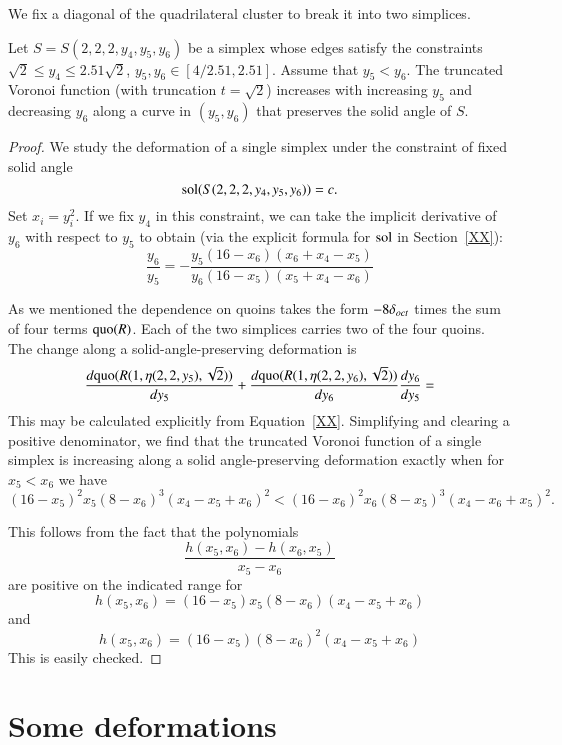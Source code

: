 We fix a diagonal of the quadrilateral cluster to break it into
two simplices.

\begin{lemma}  Let $S=S(2,2,2,y_4,y_5,y_6)$ be a simplex whose
edges satisfy the constraints $\sqrt2\le y_4\le 2.51\sqrt2$,
$y_5,y_6\in [4/2.51,2.51]$.  Assume that $y_5 < y_6$.  The
truncated Voronoi function (with truncation $t=\sqrt2$) increases
with increasing $y_5$ and decreasing $y_6$ along a curve in
$(y_5,y_6)$ that preserves the solid angle of $S$.
\end{lemma}



\begin{proof}
We study the deformation of a single simplex under the constraint
of fixed solid angle
    $$\operatorname{sol}(S(2,2,2,y_4,y_5,y_6)) = c.$$
Set $x_i = y_i^2$.  If we fix $y_4$ in this constraint, we can
take the implicit derivative of $y_6$ with respect to $y_5$ to
obtain (via the explicit formula for $\operatorname{sol}$ in Section~\ref{XX}):
    $$
    \frac{y_6}{y_5} = -\frac{y_5 (16- x_6)(x_6 + x_4 - x_5 )}
    {y_6 (16-x_5)(x_5+x_4 - x_6)}
    $$

As we mentioned the dependence on quoins takes the form $-8\delta_{oct}$
times the sum of four terms $\operatorname{quo}(R)$.  Each of the two simplices
carries two of the four quoins.  The change along a
solid-angle-preserving deformation  is
    $$
    \frac{d {\operatorname{quo}}(R(1,\eta(2,2,y_5),\sqrt2))}{d y_5} + \frac{d
    {\operatorname{quo}}(R(1,\eta(2,2,y_6),\sqrt2))} {d y_6} \frac{d y_6}{d y_5} =
    $$
This may be calculated explicitly from Equation~\ref{XX}.
Simplifying and clearing a positive denominator, we find that the
truncated Voronoi function of a single simplex is increasing along
a solid angle-preserving deformation exactly when for $x_5 < x_6$
we have
    $$
    (16-x_5)^2 x_5 (8-x_6)^3 (x_4 - x_5 + x_6)^2 <
    (16-x_6)^2 x_6 (8-x_5)^3 (x_4 - x_6 + x_5)^2.
    $$

This follows from the fact that the polynomials
    $$
    \frac{h(x_5,x_6) - h(x_6,x_5)}{x_5 - x_6}
    $$
are positive on the indicated range for
    $$
    h(x_5,x_6) = (16-x_5) x_5 (8-x_6) (x_4 - x_5 + x_6)
    $$
and
    $$
    h(x_5,x_6) = (16-x_5) (8-x_6)^2 (x_4 - x_5 + x_6)
    $$
This is easily checked.
\end{proof}



\section{Some deformations} %


